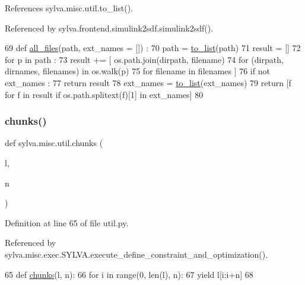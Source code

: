 References sylva.\+misc.\+util.\+to\+\_\+list().



Referenced by sylva.\+frontend.\+simulink2sdf.\+simulink2sdf().


\begin{DoxyCode}
69 \textcolor{keyword}{def }\hyperlink{namespacesylva_1_1misc_1_1util_a5dfe1979a130725652883d277a24ee5d}{all\_files}(path, ext\_names = []) :
70   path = \hyperlink{namespacesylva_1_1misc_1_1util_a03f5cfd365a10a5ec0567e320f987a9b}{to\_list}(path)
71   result = []
72   \textcolor{keywordflow}{for} p \textcolor{keywordflow}{in} path :
73     result += [ os.path.join(dirpath, filename)
74       \textcolor{keywordflow}{for} (dirpath, dirnames, filenames) \textcolor{keywordflow}{in} os.walk(p)
75         \textcolor{keywordflow}{for} filename \textcolor{keywordflow}{in} filenames ]
76   \textcolor{keywordflow}{if} \textcolor{keywordflow}{not} ext\_names :
77     \textcolor{keywordflow}{return} result
78   ext\_names = \hyperlink{namespacesylva_1_1misc_1_1util_a03f5cfd365a10a5ec0567e320f987a9b}{to\_list}(ext\_names)
79   \textcolor{keywordflow}{return} [f \textcolor{keywordflow}{for} f \textcolor{keywordflow}{in} result \textcolor{keywordflow}{if} os.path.splitext(f)[1] \textcolor{keywordflow}{in} ext\_names]
80 
\end{DoxyCode}
\mbox{\label{namespacesylva_1_1misc_1_1util_aa202ba520fb5e2daa064c4379aeeb5cf}} 
\subsubsection{\texorpdfstring{chunks()}{chunks()}}
{\footnotesize\ttfamily def sylva.\+misc.\+util.\+chunks (\begin{DoxyParamCaption}\item[{}]{l,  }\item[{}]{n }\end{DoxyParamCaption})}



Definition at line 65 of file util.\+py.



Referenced by sylva.\+misc.\+exec.\+S\+Y\+L\+V\+A.\+execute\+\_\+define\+\_\+constraint\+\_\+and\+\_\+optimization().


\begin{DoxyCode}
65 \textcolor{keyword}{def }\hyperlink{namespacesylva_1_1misc_1_1util_aa202ba520fb5e2daa064c4379aeeb5cf}{chunks}(l, n):
66   \textcolor{keywordflow}{for} i \textcolor{keywordflow}{in} range(0, len(l), n):
67     \textcolor{keywordflow}{yield} l[i:i+n]
68 
\end{DoxyCode}
\mbox{\label{namespacesylva_1_1misc_1_1util_a0ce6d1d719234031353b60ac60f2af0d}} 
